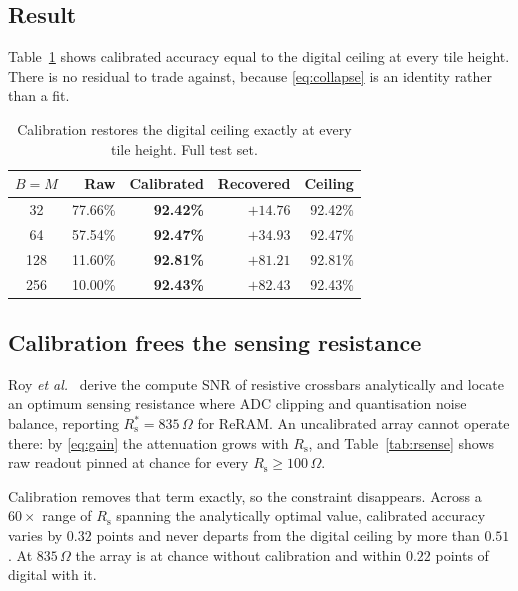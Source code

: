 \documentclass[conference,10pt]{IEEEtran}
\newcommand{\Rs}{R_{\mathrm{s}}}
\begin{document}
\subsection{Result}

Table~\ref{tab:fix} shows calibrated accuracy equal to the digital ceiling at
every tile height. There is no residual to trade against, because
\eqref{eq:collapse} is an identity rather than a fit.

\begin{table}[t]
\centering
\caption{Calibration restores the digital ceiling exactly at every tile height.
Full test set.}
\label{tab:fix}
\begin{tabular}{crrrr}
\toprule
$B{=}M$ & Raw & \textbf{Calibrated} & Recovered & Ceiling \\
\midrule
32  & 77.66\% & \textbf{92.42\%} & $+14.76$ & 92.42\% \\
64  & 57.54\% & \textbf{92.47\%} & $+34.93$ & 92.47\% \\
128 & 11.60\% & \textbf{92.81\%} & $+81.21$ & 92.81\% \\
256 & 10.00\% & \textbf{92.43\%} & $+82.43$ & 92.43\% \\
\bottomrule
\end{tabular}
\end{table}


\subsection{Calibration frees the sensing resistance}
\label{sec:rsense}

Roy \emph{et al.}~\cite{shanbhag} derive the compute SNR of resistive
crossbars analytically and locate an optimum sensing resistance where ADC
clipping and quantisation noise balance, reporting $\Rs^{*}{=}835\,\Omega$ for
ReRAM. An uncalibrated array cannot operate there: by \eqref{eq:gain} the
attenuation grows with $\Rs$, and Table~\ref{tab:rsense} shows raw readout
pinned at chance for every $\Rs \geq 100\,\Omega$.

Calibration removes that term exactly, so the constraint disappears. Across a
$60\times$ range of $\Rs$ spanning the analytically optimal value, calibrated
accuracy varies by $0.32$ points and never departs from the digital ceiling by
more than $0.51$. At $835\,\Omega$ the array is at chance without calibration
and within $0.22$ points of digital with it.
\end{document}
